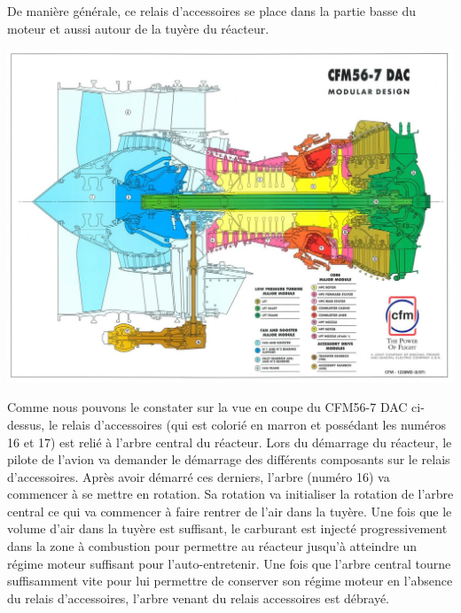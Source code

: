 \documentclass{config}
\begin{document}
\begin{spacing}{1.2}
De manière générale, ce relais d'accessoires se place dans la partie basse du moteur et aussi autour de la tuyère du réacteur.

\begin{center}
\includegraphics[scale=0.6]{CFM56-coupe.jpg}
\end{center}

Comme nous pouvons le constater sur la vue en coupe du CFM56-7 DAC ci-dessus, le relais d'accessoires (qui est colorié en marron et possédant les numéros 16 et 17) est relié à l'arbre central du réacteur. Lors du démarrage du réacteur, le pilote de l'avion va demander le démarrage des différents composants sur le relais d'accessoires. Après avoir démarré ces derniers, l'arbre (numéro 16) va commencer à se mettre en rotation. Sa rotation va initialiser la rotation de l'arbre central ce qui va commencer à faire rentrer de l'air dans la tuyère. Une fois que le volume d'air dans la tuyère est suffisant, le carburant est injecté progressivement dans la zone à combustion pour permettre au réacteur jusqu'à atteindre un régime moteur suffisant pour l'auto-entretenir. Une fois que l'arbre central tourne suffisamment vite pour lui permettre de conserver son régime moteur en l'absence du relais d'accessoires, l'arbre venant du relais accessoires est débrayé.



\end{spacing}
\end{document}
